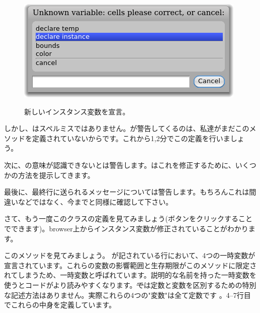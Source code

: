 \documentclass[a4paper,10pt,twoside]{book}
\begin{document}
\begin{figure}[htb]
\begin{minipage}{0.48\textwidth}
		{\includegraphics[scale=0.7]{DeclareInstanceVar}}
	\caption{新しいインスタンス変数を宣言。}
\end{minipage}
\end{figure}

しかし、はスペルミスではありません。\pharo が警告してくるのは、私達がまだこのメソッドを定義されていないからです。これから1,2分でこの定義を行いましょう。


次に、の意味が認識できないと\pharo は警告します。\pharo はこれを修正するために、いくつかの方法を提示してきます。

最後に、最終行に送られるメッセージについて\pharo は警告します。もちろんこれは間違いなどではなく、今までと同様に確認して下さい。

さて、もう一度このクラスの定義を見てみましょう(ボタンをクリックすることでできます)。browser上からインスタンス変数が修正されていることがわかります。

このメソッドを見てみましょう。
が記されている行において、4つの一時変数が宣言されています。これらの変数の影響範囲と生存期限がこのメソッドに限定されてしまうため、一時変数と呼ばれています。説明的な名前を持った一時変数を使うとコードがより読みやすくなります。\st では定数と変数を区別するための特別な記述方法はありません。実際これらの4つの"変数"は全て定数です
。4--7行目でこれらの中身を定義しています。
\end{document}
